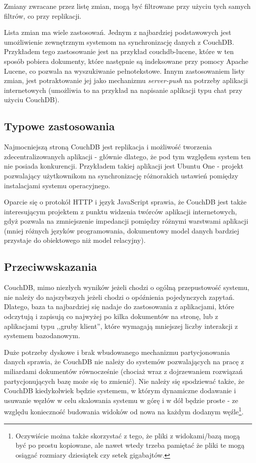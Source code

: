 Zmiany zwracane przez listę zmian, mogą być filtrowane przy użyciu tych samych filtrów, co przy replikacji.

Lista zmian ma wiele zastosowań.
Jednym z najbardziej podstawowych jest umożliwienie zewnętrznym systemom na synchronizację danych z CouchDB.
Przykładem tego zastosowanie jest na przykład couchdb-lucene, które w ten sposób pobiera dokumenty, które następnie są indeksowane przy pomocy Apache Lucene, co pozwala na wyszukiwanie pełnotekstowe.
Innym zastosowaniem listy zmian, jest potraktowanie jej jako mechanizmu \emph{server-push} na potrzeby aplikacji internetowych (umożliwia to na przykład na napisanie aplikacji typu chat przy użyciu CouchDB).

\subsection*{Typowe zastosowania}

Najmocniejszą stroną CouchDB jest replikacja i możliwość tworzenia zdecentralizowanych aplikacji - głównie dlatego, że pod tym względem system ten nie posiada konkurencji.
Przykładem takiej aplikacji jest Ubuntu One - projekt pozwalający użytkownikom na synchronizację różnorakich ustawień pomiędzy instalacjami systemu operacyjnego.

Oparcie się o protokół HTTP i język JavaScript sprawia, że CouchDB jest także interesującym projektem z punktu widzenia twórców aplikacji internetowych, gdyż pozwala na zmniejszenie impedancji pomiędzy różnymi warstwami aplikacji (mniej różnych języków programowania, dokumentowy model danych bardziej przystaje do obiektowego niż model relacyjny).

\subsection*{Przeciwwskazania}

CouchDB, mimo niezłych wyników jeżeli chodzi o ogólną przepustowość systemu, nie należy do najszybszych jeżeli chodzi o opóźnienia pojedynczych zapytań.
Dlatego, baza ta najbardziej się nadaje do zastosowania z aplikacjami, które odczytują i zapisują co najwyżej po kilka dokumentów na stronę, lub z aplikacjami typu ,,gruby klient'', które wymagają mniejszej liczby interakcji z systemem bazodanowym.

Duże potrzeby dyskowe i brak wbudowanego mechanizmu partycjonowania danych sprawia, że CouchDB nie należy do systemów pozwalających na pracę z miliardami dokumentów równocześnie (chociaż wraz z dojrzewaniem rozwiązań partycjonujących bazę może się to zmienić).
Nie należy się spodziewać także, że CouchDB kiedykolwiek będzie systemem, w którym dynamiczne dodawanie i usuwanie węzłów w celu skalowania systemu w górę i w dół będzie proste - ze względu konieczność budowania widoków od nowa na każdym dodanym węźle\footnote{Oczywiście można także skorzystać z tego, że pliki z widokami/bazą mogą być po prostu kopiowane, ale nawet wtedy trzeba pamiętać że pliki te mogą osiągać rozmiary dziesiątek czy setek gigabajtów.}. 

